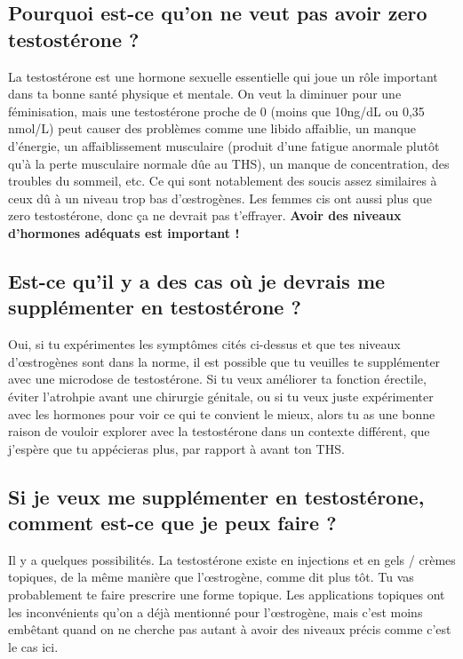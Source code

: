 \documentclass{article}
\begin{document}
\subsection{Pourquoi est-ce qu'on ne veut pas avoir zero testostérone ?}

La testostérone est une hormone sexuelle essentielle qui joue un rôle important dans ta bonne santé physique et mentale. On veut la diminuer pour une féminisation, mais une testostérone proche de 0 (moins que 10ng/dL ou 0,35 nmol/L) peut causer des problèmes comme une libido affaiblie, un manque d'énergie, un affaiblissement musculaire (produit d'une fatigue anormale plutôt qu'à la perte musculaire normale dûe au THS), un manque de concentration, des troubles du sommeil, etc. Ce qui sont notablement des soucis assez similaires à ceux dû à un niveau trop bas d'œstrogènes. Les femmes cis ont aussi plus que zero testostérone, donc ça ne devrait pas t'effrayer. \textbf{Avoir des niveaux d'hormones adéquats est important !}

\subsection{Est-ce qu'il y a des cas où je devrais me supplémenter en testostérone ?}\label{9-2}

Oui, si tu expérimentes les symptômes cités ci-dessus et que tes niveaux d'œstrogènes sont dans la norme, il est possible que tu veuilles te supplémenter avec une microdose de testostérone. Si tu veux améliorer ta fonction érectile, éviter l'atrohpie avant une chirurgie génitale, ou si tu veux juste expérimenter avec les hormones pour voir ce qui te convient le mieux, alors tu as une bonne raison de vouloir explorer avec la testostérone dans un contexte différent, que j'espère que tu appécieras plus, par rapport à avant ton THS.

\subsection{Si je veux me supplémenter en testostérone, comment est-ce que je peux faire ?}

Il y a quelques possibilités. La testostérone existe en injections et en gels / crèmes topiques, de la même manière que l'œstrogène, comme dit plus tôt. Tu vas probablement te faire prescrire une forme topique. Les applications topiques ont les inconvénients qu'on a déjà mentionné pour l'œstrogène, mais c'est moins embêtant quand on ne cherche pas autant à avoir des niveaux précis comme c'est le cas ici.
\end{document}
